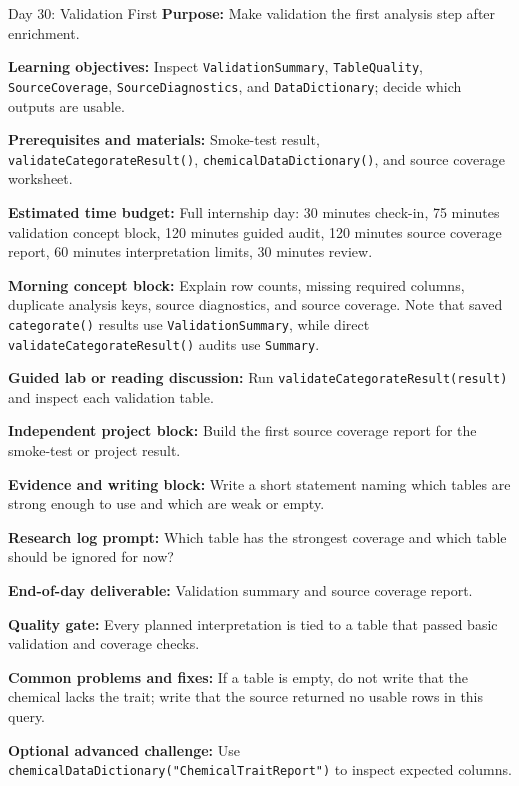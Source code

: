 \begin{dailybox}{Day 30: Validation First}
\textbf{Purpose:} Make validation the first analysis step after enrichment.

\textbf{Learning objectives:} Inspect \texttt{ValidationSummary}, \texttt{TableQuality}, \texttt{SourceCoverage}, \texttt{SourceDiagnostics}, and \texttt{DataDictionary}; decide which outputs are usable.

\textbf{Prerequisites and materials:} Smoke-test result, \texttt{validateCategorateResult()}, \texttt{chemicalDataDictionary()}, and source coverage worksheet.

\textbf{Estimated time budget:} Full internship day: 30 minutes check-in, 75 minutes validation concept block, 120 minutes guided audit, 120 minutes source coverage report, 60 minutes interpretation limits, 30 minutes review.

\textbf{Morning concept block:} Explain row counts, missing required columns, duplicate analysis keys, source diagnostics, and source coverage. Note that saved \texttt{categorate()} results use \texttt{ValidationSummary}, while direct \texttt{validateCategorateResult()} audits use \texttt{Summary}.

\textbf{Guided lab or reading discussion:} Run \texttt{validateCategorateResult(result)} and inspect each validation table.

\textbf{Independent project block:} Build the first source coverage report for the smoke-test or project result.

\textbf{Evidence and writing block:} Write a short statement naming which tables are strong enough to use and which are weak or empty.

\textbf{Research log prompt:} Which table has the strongest coverage and which table should be ignored for now?

\textbf{End-of-day deliverable:} Validation summary and source coverage report.

\textbf{Quality gate:} Every planned interpretation is tied to a table that passed basic validation and coverage checks.

\textbf{Common problems and fixes:} If a table is empty, do not write that the chemical lacks the trait; write that the source returned no usable rows in this query.

\textbf{Optional advanced challenge:} Use \texttt{chemicalDataDictionary("ChemicalTraitReport")} to inspect expected columns.
\end{dailybox}

